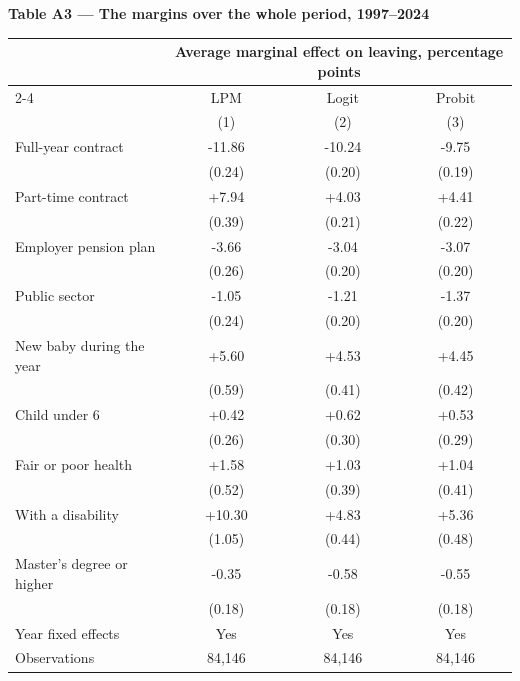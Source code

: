 \documentclass[11pt]{article}
\newcommand{\sym}[1]{\rlap{$^{#1}$}}
\begin{document}
\begin{center}
{\large\bfseries Table A3 --- The margins over the whole period,
1997--2024}\\[1.0em]
\begin{threeparttable}
\begin{tabular}{lccc}
\toprule
 & \multicolumn{3}{c}{Average marginal effect on leaving, percentage points} \\
\cmidrule(lr){2-4}
 & LPM & Logit & Probit \\
 & (1) & (2) & (3) \\
\midrule
Full-year contract & -11.86\sym{***} & -10.24\sym{***} & -9.75\sym{***} \\
  & (0.24) & (0.20) & (0.19) \\[0.2em]
Part-time contract & +7.94\sym{***} & +4.03\sym{***} & +4.41\sym{***} \\
  & (0.39) & (0.21) & (0.22) \\[0.2em]
Employer pension plan & -3.66\sym{***} & -3.04\sym{***} & -3.07\sym{***} \\
  & (0.26) & (0.20) & (0.20) \\[0.2em]
Public sector & -1.05\sym{***} & -1.21\sym{***} & -1.37\sym{***} \\
  & (0.24) & (0.20) & (0.20) \\[0.2em]
New baby during the year & +5.60\sym{***} & +4.53\sym{***} & +4.45\sym{***} \\
  & (0.59) & (0.41) & (0.42) \\[0.2em]
Child under 6 & +0.42 & +0.62\sym{**} & +0.53\sym{*} \\
  & (0.26) & (0.30) & (0.29) \\[0.2em]
Fair or poor health & +1.58\sym{***} & +1.03\sym{***} & +1.04\sym{**} \\
  & (0.52) & (0.39) & (0.41) \\[0.2em]
With a disability & +10.30\sym{***} & +4.83\sym{***} & +5.36\sym{***} \\
  & (1.05) & (0.44) & (0.48) \\[0.2em]
Master's degree or higher & -0.35\sym{**} & -0.58\sym{***} & -0.55\sym{***} \\
  & (0.18) & (0.18) & (0.18) \\[0.2em]
\midrule
Year fixed effects & Yes & Yes & Yes \\
Observations       & 84,146 & 84,146 & 84,146 \\
\bottomrule
\end{tabular}
\begin{tablenotes}[flushleft]

\end{tablenotes}
\end{threeparttable}
\end{center}
\end{document}
